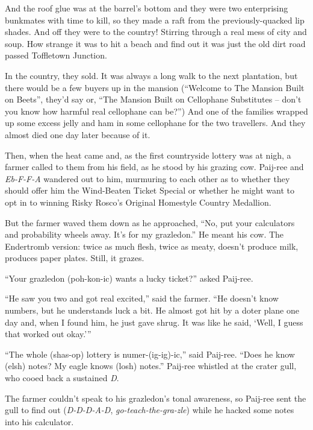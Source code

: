 \documentclass[10pt,twoside]{report}
\begin{document}
And the roof glue was at the barrel's bottom and they were two
enterprising bunkmates with time to kill, so they made a raft from the
previously-quacked lip shades.  And off they were to the country!
Stirring through a real mess of city and soup.  How strange it was to
hit a beach and find out it was just the old dirt road passed
Toffletown Junction.

In the country, they sold.  It was always a long walk to the next
plantation, but there would be a few buyers up in the mansion
(``Welcome to The Mansion Built on Beets'', they'd say or, ``The
Mansion Built on Cellophane Substitutes -- don't you know how harmful
real cellophane can be?'')  And one of the families wrapped up some
excess jelly and ham in some cellophane for the two travellers.  And
they almost died one day later because of it.

Then, when the heat came and, as the first countryside lottery was at
nigh, a farmer called to them from his field, as he stood by his
grazing cow. Paij-ree and {\em Eb-F-F-A} wandered out to him,
murmuring to each other as to whether they should offer him the
Wind-Beaten Ticket Special or whether he might want to opt in to
winning Risky Rosco's Original Homestyle Country Medallion.

But the farmer waved them down as he approached, ``No, put your
calculators and probability wheels away.  It's for my grazledon.''  He
meant his cow.  The Endertromb version: twice as much flesh, twice as
meaty, doesn't produce milk, produces paper plates.  Still, it grazes.

``Your grazledon (poh-kon-ic) wants a lucky ticket?'' asked Paij-ree.

``He saw you two and got real excited,'' said the farmer.  ``He
doesn't know numbers, but he understands luck a bit.  He almost got
hit by a doter plane one day and, when I found him, he just gave
shrug.  It was like he said, `Well, I guess that worked out okay.'''

``The whole (shas-op) lottery is numer-(ig-ig)-ic,'' said Paij-ree.
``Does he know (elsh) notes?  My eagle knows (losh) notes.''  Paij-ree
whistled at the crater gull, who cooed back a sustained {\em D}.

The farmer couldn't speak to his grazledon's tonal awareness, so
Paij-ree sent the gull to find out ({\em D-D-D-A-D}, {\em
  go-teach-the-gra-zle}) while he hacked some notes into his
calculator.
\end{document}
